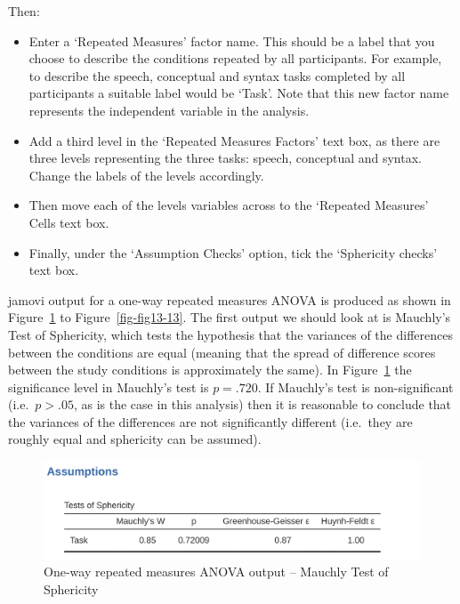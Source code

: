 \documentclass[
  a4paper,
]{book}
\providecommand{\tightlist}{%
  \setlength{\itemsep}{0pt}\setlength{\parskip}{0pt}}\usepackage{longtable,booktabs,array}
\begin{document}
Then:

\begin{itemize}
\tightlist
\item
  Enter a `Repeated Measures' factor name. This should be a label that
  you choose to describe the conditions repeated by all participants.
  For example, to describe the speech, conceptual and syntax tasks
  completed by all participants a suitable label would be `Task'. Note
  that this new factor name represents the independent variable in the
  analysis.
\item
  Add a third level in the `Repeated Measures Factors' text box, as
  there are three levels representing the three tasks: speech,
  conceptual and syntax. Change the labels of the levels accordingly.
\item
  Then move each of the levels variables across to the `Repeated
  Measures' Cells text box.
\item
  Finally, under the `Assumption Checks' option, tick the `Sphericity
  checks' text box.
\end{itemize}

jamovi output for a one-way repeated measures ANOVA is produced as shown
in Figure~\ref{fig-fig13-10} to Figure~\ref{fig-fig13-13}. The first
output we should look at is Mauchly's Test of Sphericity, which tests
the hypothesis that the variances of the differences between the
conditions are equal (meaning that the spread of difference scores
between the study conditions is approximately the same). In
Figure~\ref{fig-fig13-10} the significance level in Mauchly's test is
\(p = .720\). If Mauchly's test is non-significant (i.e.~\(p > .05\), as
is the case in this analysis) then it is reasonable to conclude that the
variances of the differences are not significantly different (i.e.~they
are roughly equal and sphericity can be assumed).

\begin{figure}

\includegraphics[width=1\textwidth,height=\textheight]{images/fig13-10.png} \hfill{}

\caption{\label{fig-fig13-10}One-way repeated measures ANOVA output --
Mauchly Test of Sphericity}

\end{figure}
\end{document}
